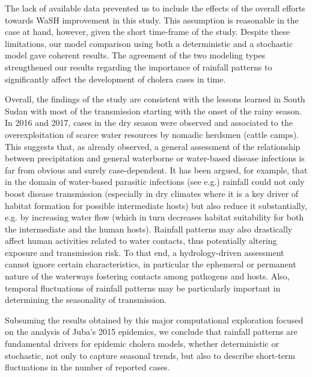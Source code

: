 The lack of available data prevented us to include the effects of the overall efforts towards WaSH improvement in this study. This assumption is reasonable in the case at hand, however, given the short time-frame of the study. %
Despite these limitations, our model comparison using both a deterministic and a stochastic model gave coherent results. The agreement of the two modeling types strengthened our results regarding the importance of rainfall patterns to significantly affect the development of cholera cases in time.

Overall, the findings of the study are consistent with the lessons learned in South Sudan with most of the transmission starting with the onset of the rainy season. In 2016 and 2017, cases in the dry season were observed and associated to the overexploitation of scarce water resources by nomadic herdsmen (cattle camps). This suggests that, as already observed, a general assessment of the relationship between precipitation and general waterborne or water-based disease infections is far from obvious and surely case-dependent. It has been argued, for example, that in the domain of water-based parasitic infections (see e.g.\cite{McCreesh:ChallengesPredictingEffects:2013,Rinaldo:ModelingKeyDrivers:2017}) rainfall could not only boost disease transmission (especially in dry climates where it is a key driver of habitat formation for possible intermediate hosts) but also reduce it substantially, e.g. by increasing water flow (which in turn decreases habitat suitability for both the intermediate and the human hosts). Rainfall patterns may also drastically affect human activities related to water contacts, thus potentially altering exposure and transmission risk\cite{Lai:SpatialDistributionSchistosomiasis:2015}. To that end, a hydrology-driven assessment cannot ignore certain characteristics, in particular the ephemeral or permanent nature of the waterways fostering contacts among pathogens and hosts\cite{Perez-Saez:HydrologyDensityFeedbacks:2016}. Also, temporal fluctuations of rainfall patterns may be particularly important in determining the seasonality of transmission\cite{Bertuzzo:HydroclimatologyDualpeakAnnual:2012,Bertuzzo:PredictionSpatialEvolution:2011,McCreesh:PredictingEffectsClimate:2015,Perez-Saez:HydrologyDensityFeedbacks:2016}.


Subsuming the results obtained by this major computational exploration focused on the analysis of Juba's 2015 epidemics, we conclude that rainfall patterns are fundamental drivers for epidemic cholera models, whether deterministic or stochastic, not only to capture seasonal trends, but also to describe short-term fluctuations in the number of reported cases. 

